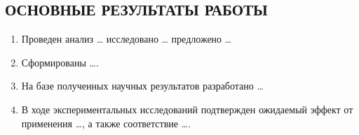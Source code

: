 
%
%
%
%

\subsection*{\MakeUppercase{Основные результаты работы}}

\begin{enumerate}

\item Проведен анализ \dots{} исследовано \dots{} предложено \dots{}

\item Сформированы \dots{}.

\item На базе полученных научных результатов разработано \dots{}

\item В ходе экспериментальных исследований подтвержден ожидаемый
  эффект от применения \dots{}, а также соответствие \dots{}.

\end{enumerate}
